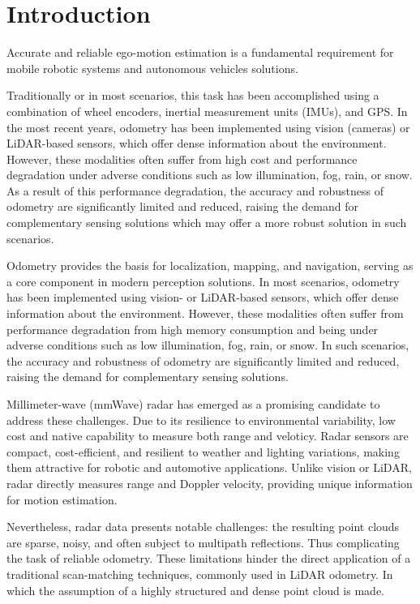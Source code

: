 \section{Introduction}
\label{sec:intoduction}

Accurate and reliable ego-motion estimation is a fundamental requirement for mobile robotic systems and autonomous vehicles solutions.

Traditionally or in most scenarios, this task has been accomplished using a combination of wheel encoders, inertial measurement units (IMUs), and GPS.
In the most recent years, odometry has been implemented using vision (cameras) or LiDAR-based sensors, which offer dense information about the environment.
However, these modalities often suffer from high cost and performance degradation under adverse conditions such as low illumination, fog, rain, or snow.
As a result of this performance degradation, the accuracy and robustness of odometry are significantly limited and reduced, raising the demand for complementary sensing solutions which may offer a more robust solution in such scenarios.

Odometry provides the basis for localization, mapping, and navigation, serving as a core component in modern perception solutions.  
In most scenarios, odometry has been implemented using vision- or LiDAR-based sensors, which offer dense information about the environment.  
However, these modalities often suffer from performance degradation from high memory consumption and being under adverse conditions such as low illumination, fog, rain, or snow.  
In such scenarios, the accuracy and robustness of odometry are significantly limited and reduced, raising the demand for complementary sensing solutions.  

Millimeter-wave (mmWave) radar has emerged as a promising candidate to address these challenges. Due to its resilience to environmental variability, low cost and native capability to measure both range and veloticy.
Radar sensors are compact, cost-efficient, and resilient to weather and lighting variations, making them attractive for robotic and automotive applications.  
Unlike vision or LiDAR, radar directly measures range and Doppler velocity, providing unique information for motion estimation.  

Nevertheless, radar data presents notable challenges: the resulting point clouds are sparse, noisy, and often subject to multipath reflections. 
Thus complicating the task of reliable odometry.  
These limitations hinder the direct application of a traditional scan-matching techniques, commonly used in LiDAR odometry. In which the assumption of a highly structured and dense point cloud is made.

